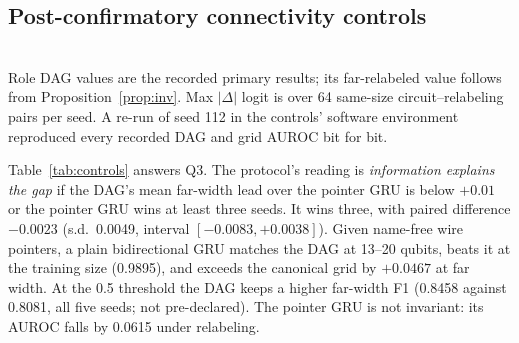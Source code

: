 \documentclass[conference,a4paper]{IEEEtran}
\begin{document}
\subsection{Post-confirmatory connectivity controls}\label{sec:controls}
\begin{table}[t]
\centering
\caption{Connectivity and augmentation controls (post-confirmatory): AUROC (mean $\pm$ s.d.) and DAG$-$model far-width paired differences}
\label{tab:controls}
\setlength{\tabcolsep}{2.4pt}
\\[2pt]
\footnotesize{Role DAG values are the recorded primary results; its far-relabeled value follows from Proposition~\ref{prop:inv}. Max $|\Delta|$ logit is over 64 same-size circuit--relabeling pairs per seed. A re-run of seed 112 in the controls' software environment reproduced every recorded DAG and grid AUROC bit for bit.}
\end{table}

Table~\ref{tab:controls} answers Q3. The protocol's reading is \emph{information explains the gap} if the DAG's mean far-width lead over the pointer GRU is below $+0.01$ or the pointer GRU wins at least three seeds. It wins three, with paired difference $-0.0023$ (s.d.\ 0.0049, interval $[-0.0083,+0.0038]$). Given name-free wire pointers, a plain bidirectional GRU matches the DAG at 13--20 qubits, beats it at the training size (0.9895), and exceeds the canonical grid by $+0.0467$ at far width. At the 0.5 threshold the DAG keeps a higher far-width F1 (0.8458 against 0.8081, all five seeds; not pre-declared). The pointer GRU is not invariant: its AUROC falls by 0.0615 under relabeling.
\end{document}
